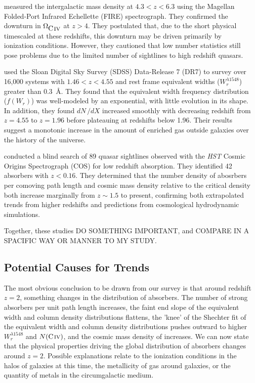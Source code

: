 \documentclass[linenumbers,twocolumn]{aastex61}
\begin{document}
\cite{Simcoe2011} measured the intergalactic {\CIV} mass density at $4.3 < z < 6.3$ using the Magellan Folded-Port Infrared Echellette (FIRE) spectrograph. They confirmed the downturn in $\Omega_{\hbox{{\rm C}\kern 0.1em{\sc iv}}}$ at $z > 4$. They postulated that, due to the short physical timescaled at these redshifts, this downturn may be driven primarily by ionization conditions. However, they cautioned that low number statistics still pose problems due to the limited number of sightlines to high redshift quasars.

\cite{Cooksey2013} used the Sloan Digital Sky Survey (SDSS) Data-Release 7 (DR7) to survey over 16,000 {\CIV} systems with $1.46 < z < 4.55$ and rest frame equivalent widths ($W_r^{\lambda1548}$) greater than $0.3$~{\AA}. They found that the equivalent width frequency distribution ($f(W_r)$) was well-modeled by an exponential, with little evolution in its shape. In addition, they found $dN\,/dX$ increased smoothly with decreasing redshift from $z = 4.55$ to $z = 1.96$ before plateauing at redshifts below 1.96. Their results suggest a monotonic increase in the amount of {\CIV} enriched gas outside galaxies over the history of the universe.

\cite{Burchett2015} conducted a blind search of 89 quasar sightlines observed with the {\it HST} Cosmic Origins Spectrograph (COS) for low redshift {\CIV} absorption. They identified 42 absorbers with $z < 0.16$. They determined that the number density of {\CIV} abosrbers per comoving path length and cosmic mass density relative to the critical density both increase marginally from $z \sim 1.5$ to present, confirming both extrapolated trends from higher redshifts and predictions from cosmological hydrodynamic simulations.

Together, these studies DO SOMETHING IMPORTANT, and COMPARE IN A SPACIFIC WAY OR MANNER TO MY STUDY.

\subsection{Potential Causes for Trends}
\label{trendcauses}

The most obvious conclusion to be drawn from our {\CIV} survey is that around redshift $z = 2$, something changes in the distribution of {\CIV} absorbers. The number of strong absorbers per unit path length increases, the faint end slope of the equivalent width and column density distributions flattens, the 'knee' of the Shechter fit of the equivalent width and column density distributions pushes outward to higher $W_r^{\lambda1548}$ and $N(\hbox{{\rm C}\kern 0.1em{\sc iv}})$, and the cosmic mass density of {\CIV} increases. We can now state that the physical properties driving the global distribution of {\CIV} absorbers changes around $z = 2$. Possible explanations relate to the ionization conditions in the halos of galaxies at this time, the metallicity of gas around galaxies, or the quantity of metals in the circumgalactic medium.
\end{document}
